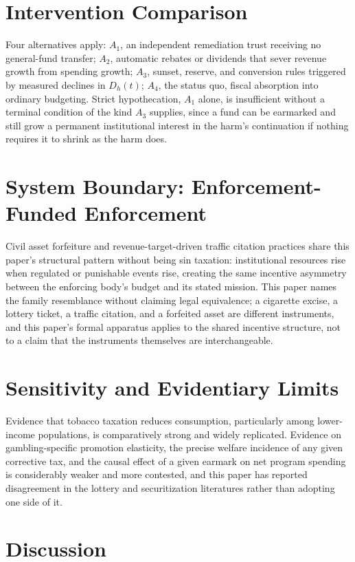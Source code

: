 \documentclass[11pt]{article}
\begin{document}
\section{Intervention Comparison}

Four alternatives apply: $A_1$, an independent remediation trust receiving no general-fund transfer; $A_2$, automatic rebates or dividends that sever revenue growth from spending growth; $A_3$, sunset, reserve, and conversion rules triggered by measured declines in $D_h(t)$; $A_4$, the status quo, fiscal absorption into ordinary budgeting. Strict hypothecation, $A_1$ alone, is insufficient without a terminal condition of the kind $A_3$ supplies, since a fund can be earmarked and still grow a permanent institutional interest in the harm's continuation if nothing requires it to shrink as the harm does.

\section{System Boundary: Enforcement-Funded Enforcement}

Civil asset forfeiture and revenue-target-driven traffic citation practices share this paper's structural pattern without being sin taxation: institutional resources rise when regulated or punishable events rise, creating the same incentive asymmetry between the enforcing body's budget and its stated mission. This paper names the family resemblance without claiming legal equivalence; a cigarette excise, a lottery ticket, a traffic citation, and a forfeited asset are different instruments, and this paper's formal apparatus applies to the shared incentive structure, not to a claim that the instruments themselves are interchangeable.

\section{Sensitivity and Evidentiary Limits}

Evidence that tobacco taxation reduces consumption, particularly among lower-income populations, is comparatively strong and widely replicated. Evidence on gambling-specific promotion elasticity, the precise welfare incidence of any given corrective tax, and the causal effect of a given earmark on net program spending is considerably weaker and more contested, and this paper has reported disagreement in the lottery and securitization literatures rather than adopting one side of it.

\section{Discussion}
\end{document}
